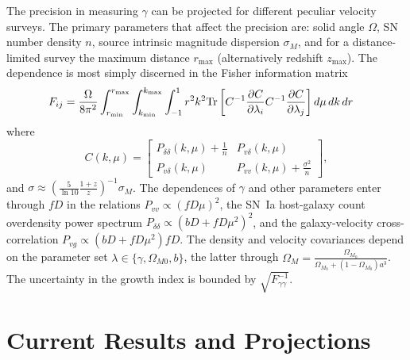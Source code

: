 \documentclass[11pt, oneside]{article}   	%
\begin{document}
The precision  in measuring $\gamma$ can be projected for different peculiar velocity surveys.
The primary  parameters that affect the precision are: solid angle $\Omega$, SN number density $n$, source intrinsic
magnitude dispersion $\sigma_M$, and for a distance-limited survey the maximum distance $r_{\text{max}}$ (alternatively redshift $z_{\text{max}}$).
The dependence is most simply discerned 
in the  Fisher information matrix
\begin{align}
F_{ij} 
& = \frac{\Omega}{8\pi^2} \int_{r_{\rm min}}^{r_{\rm max}}  \int_{k_{\rm min}}^{k_{\rm max}}  \int_{-1}^{1} r^2 k^2 \text{Tr}\left[ C^{-1} \frac{\partial C}{\partial \lambda_i} C^{-1}
\frac{\partial C}{\partial \lambda_j} \right] d\mu\,dk\,dr
\label{fisher:eqn}
\end{align}
where
\begin{equation}
C(k,\mu)  =
  \begin{bmatrix}
   P_{\delta \delta}(k,\mu) + \frac{1}{n} &
   P_{v\delta}(k,\mu)  \\
   P_{v\delta}(k,\mu)  &
  P_{vv}(k,\mu) + \frac{\sigma^2}{n}
   \end{bmatrix},
\label{cov:eq}
\end{equation}
and $\sigma \approx (\frac{5}{\ln{10}} \frac{1+z}{z})^{-1} \sigma_M$.
The dependences of $\gamma$ and other parameters enter through $fD$ in the relations $P_{vv}\propto (fD\mu)^2$, the SN~Ia host-galaxy count overdensity
power spectrum $P_{\delta \delta }\propto (bD + fD\mu^2)^2$, and the galaxy-velocity cross-correlation $P_{vg}
\propto  (bD + fD\mu^2)fD$.  
 The density and velocity covariances depend on the parameter set $\lambda \in \{\gamma, \Omega_{M0}, b\}$, the latter through
$\Omega_M=\frac{\Omega_{M_0}}{\Omega_{M_0} + (1-\Omega_{M_0})a^3}$.  
The uncertainty in the growth index is bounded by $\sqrt{F^{-1}_{\gamma \gamma}}$.

\section{Current Results and Projections}
\end{document}
